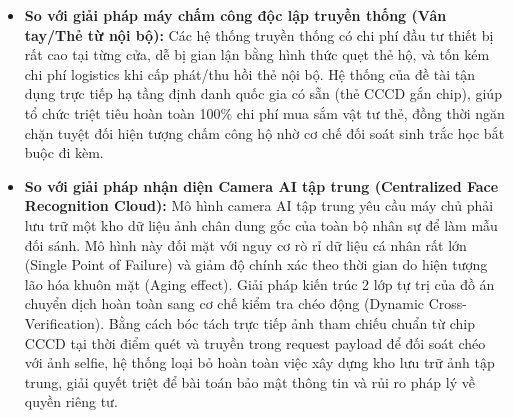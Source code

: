 ﻿\documentclass[../DoAn.tex]{subfiles}
\begin{document}
\begin{itemize}
    \item \textbf{So với giải pháp máy chấm công độc lập truyền thống (Vân tay/Thẻ từ nội bộ):} Các hệ thống truyền thống có chi phí đầu tư thiết bị rất cao tại từng cửa, dễ bị gian lận bằng hình thức quẹt thẻ hộ, và tốn kém chi phí logistics khi cấp phát/thu hồi thẻ nội bộ. Hệ thống của đề tài tận dụng trực tiếp hạ tầng định danh quốc gia có sẵn (thẻ CCCD gắn chip), giúp tổ chức triệt tiêu hoàn toàn 100\% chi phí mua sắm vật tư thẻ, đồng thời ngăn chặn tuyệt đối hiện tượng chấm công hộ nhờ cơ chế đối soát sinh trắc học bắt buộc đi kèm.
    \item \textbf{So với giải pháp nhận diện Camera AI tập trung (Centralized Face Recognition Cloud):} Mô hình camera AI tập trung yêu cầu máy chủ phải lưu trữ một kho dữ liệu ảnh chân dung gốc của toàn bộ nhân sự để làm mẫu đối sánh. Mô hình này đối mặt với nguy cơ rò rỉ dữ liệu cá nhân rất lớn (Single Point of Failure) và giảm độ chính xác theo thời gian do hiện tượng lão hóa khuôn mặt (Aging effect). Giải pháp kiến trúc 2 lớp tự trị của đồ án chuyển dịch hoàn toàn sang cơ chế kiểm tra chéo động (Dynamic Cross-Verification). Bằng cách bóc tách trực tiếp ảnh tham chiếu chuẩn từ chip CCCD tại thời điểm quét và truyền trong request payload để đối soát chéo với ảnh selfie, hệ thống loại bỏ hoàn toàn việc xây dựng kho lưu trữ ảnh tập trung, giải quyết triệt để bài toán bảo mật thông tin và rủi ro pháp lý về quyền riêng tư.
\end{itemize}
\end{document}
